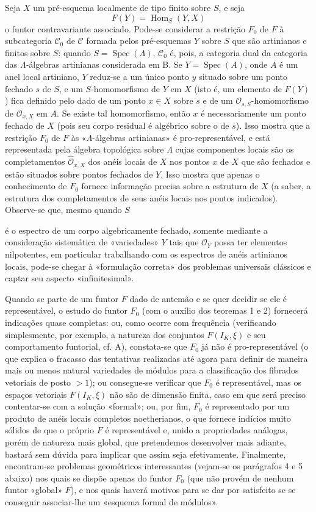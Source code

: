 Seja $X$ um pré-esquema localmente de tipo finito sobre $S$, e seja
\[
  F(Y)=\operatorname{Hom}_S(Y,X)
\]
o funtor contravariante associado. Pode-se considerar a restrição $F_0$ de
$F$ à subcategoria $\mathcal C_0$ de $\mathcal C$ formada pelos
pré-esquemas $Y$ sobre $S$ que são artinianos e finitos sobre $S$: quando
$S=\operatorname{Spec}(\Lambda)$, $\mathcal C_0$ é, pois, a categoria dual
da categoria das $\Lambda$-álgebras artinianas considerada em B. Se
$Y=\operatorname{Spec}(A)$, onde $A$ é um anel local artiniano, $Y$
reduz-se a um único ponto $y$ situado sobre um ponto fechado $s$ de $S$, e um
$S$-homomorfismo de $Y$ em $X$ (isto é, um elemento de $F(Y)$) fica definido
pelo dado de um ponto $x\in X$ sobre $s$ e de um
$\mathcal O_{s,S}$-homomorfismo de $\mathcal O_{x,X}$ em $A$. Se existe tal
homomorfismo, então $x$ é necessariamente um ponto fechado de $X$ (pois seu
corpo residual é algébrico sobre o de $s$). Isso mostra que a restrição
$F_0$ de $F$ às «$\Lambda$-álgebras artinianas» é pro-representável, e está
representada pela álgebra topológica sobre $\Lambda$ cujas componentes
locais são os completamentos $\widehat{\mathcal O}_{x,X}$ dos anéis locais
de $X$ nos pontos $x$ de $X$ que são fechados e estão situados sobre pontos
fechados de $Y$. Isso mostra que apenas o conhecimento de $F_0$ fornece
informação precisa sobre a estrutura de $X$ (a saber, a estrutura dos
completamentos de seus anéis locais nos pontos indicados). Observe-se que,
mesmo quando $S$

é o espectro de um corpo algebricamente fechado, somente mediante a
consideração sistemática de «variedades» $Y$ tais que $\mathcal O_Y$ possa
ter elementos nilpotentes, em particular trabalhando com os espectros de
anéis artinianos locais, pode-se chegar à «formulação correta» dos
problemas universais clássicos e captar seu aspecto «infinitesimal».

Quando se parte de um funtor $F$ dado de antemão e se quer decidir se ele é
representável, o estudo do funtor $F_0$ (com o auxílio dos teoremas 1 e 2)
fornecerá indicações quase completas: ou, como ocorre com frequência
(verificando simplesmente, por exemplo, a natureza dos conjuntos
$F(I_K,\xi)$ e seu comportamento funtorial, cf. A), constata-se que $F_0$ já não
é pro-representável (o que explica o fracasso das tentativas realizadas
até agora para definir de maneira mais ou menos natural variedades de módulos
para a classificação dos fibrados vetoriais de posto $>1$); ou consegue-se
verificar que $F_0$ é representável, mas os espaços vetoriais
$F(I_K,\xi)$ não são de dimensão finita, caso em que será preciso contentar-se com
a solução «formal»; ou, por fim, $F_0$ é representado por um
produto de anéis locais completos noetherianos, o que fornece indícios muito
sólidos de que o próprio $F$ é representável e, unido a propriedades análogas,
porém de natureza mais global, que pretendemos desenvolver mais adiante, bastará
sem dúvida para implicar que assim seja efetivamente. Finalmente, encontram-se
problemas geométricos interessantes (vejam-se os parágrafos 4 e 5 abaixo) nos
quais se dispõe apenas do funtor $F_0$ (que não provém de nenhum funtor «global»
$F$), e nos quais haverá motivos para se dar por satisfeito se se conseguir associar-lhe
um «esquema formal de módulos».

